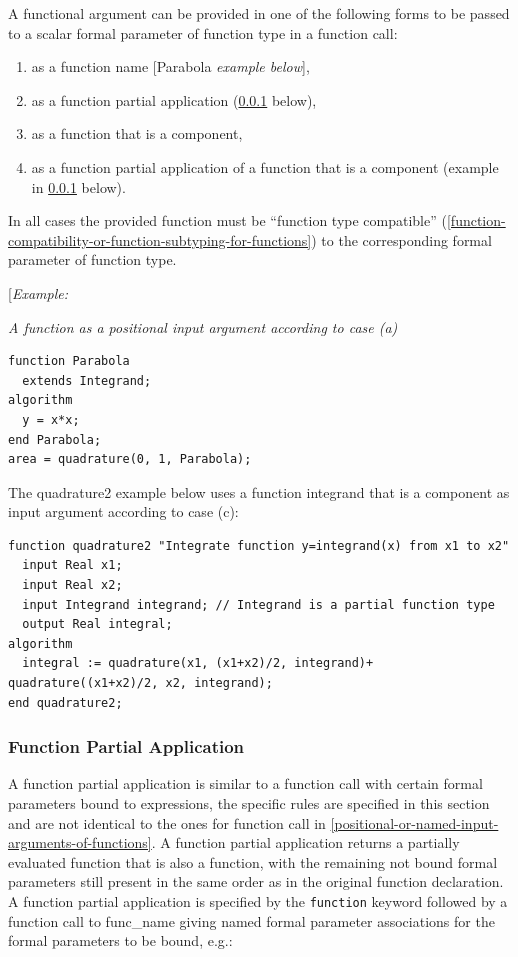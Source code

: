 \documentclass[10pt,a4paper]{report}
\def\doublelabel#1{\label{#1}\hypertarget{#1}{}}
\renewcommand{\labelenumi}{\arabic{enumi}.}
\begin{document}
A functional argument can be provided in one of the following forms to
be passed to a scalar formal parameter of function type in a function
call:

\begin{enumerate}
\def\labelenumi{\alph{enumi})}
\item
  as a function name {[}Parabola \emph{example below}{]},
\item
  as a function partial application (\ref{function-partial-application} below),
\item
  as a function that is a component,
\item
  as a function partial application of a function that is a component
  (example in \ref{function-partial-application} below).
\end{enumerate}

In all cases the provided function must be ``function type compatible''
(\ref{function-compatibility-or-function-subtyping-for-functions}) to the corresponding formal parameter of function type.

{[}\emph{Example:}

\emph{A function as a positional input argument according to case (a)}

\begin{lstlisting}[language=modelica]
function Parabola
  extends Integrand;
algorithm
  y = x*x;
end Parabola;
area = quadrature(0, 1, Parabola);
\end{lstlisting}
The quadrature2 example below uses a function integrand that is a
component as input argument according to case (c):

\begin{lstlisting}[language=modelica]
  function quadrature2 "Integrate function y=integrand(x) from x1 to x2"
  input Real x1;
  input Real x2;
  input Integrand integrand; // Integrand is a partial function type
  output Real integral;
algorithm
  integral := quadrature(x1, (x1+x2)/2, integrand)+  quadrature((x1+x2)/2, x2, integrand);
end quadrature2;
\end{lstlisting}
\subsubsection{Function Partial Application}\doublelabel{function-partial-application}

A function partial application is similar to a function call with
certain formal parameters bound to expressions, the specific rules are
specified in this section and are not identical to the ones for function
call in \ref{positional-or-named-input-arguments-of-functions}. A function partial application returns a partially
evaluated function that is also a function, with the remaining not bound
formal parameters still present in the same order as in the original
function declaration. A function partial application is specified by the
\lstinline!function! keyword followed by a function call to func\_name
giving named formal parameter associations for the formal parameters to
be bound, e.g.:
\end{document}
